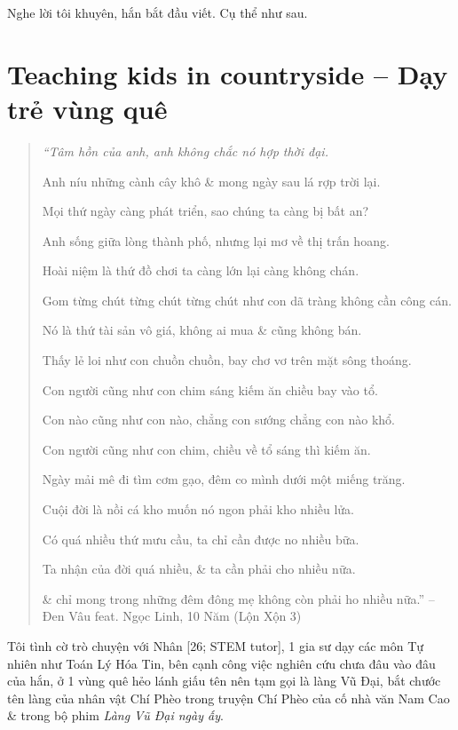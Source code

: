 \documentclass[12pt,twoside]{book}
\begin{document}
Nghe lời tôi khuyên, hắn bắt đầu viết. Cụ thể như sau.

\section{Teaching kids in countryside -- Dạy trẻ vùng quê}

\begin{quote}\small\it
	``Tâm hồn của anh, anh không chắc nó hợp thời đại.
	
	Anh níu những cành cây khô \& mong ngày sau lá rợp trời lại.
	
	Mọi thứ ngày càng phát triển, sao chúng ta càng bị bất an?
	
	Anh sống giữa lòng thành phố, nhưng lại mơ về thị trấn hoang.
	
	Hoài niệm là thứ đồ chơi ta càng lớn lại càng không chán.
	
	Gom từng chút từng chút từng chút như con dã tràng không cần công cán.
	
	Nó là thứ tài sản vô giá, không ai mua \& cũng không bán.
	
	Thấy lẻ loi như con chuồn chuồn, bay chơ vơ trên mặt sông thoáng.
	
	Con người cũng như con chim sáng kiếm ăn chiều bay vào tổ.
	
	Con nào cũng như con nào, chẳng con sướng chẳng con nào khổ.
	
	Con người cũng như con chim, chiều về tổ sáng thì kiếm ăn.
	
	Ngày mải mê đi tìm cơm gạo, đêm co mình dưới một miếng trăng.
	
	Cuội đời là nồi cá kho muốn nó ngon phải kho nhiều lửa.
	
	Có quá nhiều thứ mưu cầu, ta chỉ cần được no nhiều bữa.
	
	Ta nhận của đời quá nhiều, \& ta cần phải cho nhiều nữa.
	
	\& chỉ mong trong những đêm đông mẹ không còn phải ho nhiều nữa.'' -- {\sc Đen Vâu} feat. {\sc Ngọc Linh}, 10 Năm (Lộn Xộn 3)
\end{quote}
Tôi tình cờ trò chuyện với {\sf Nhân [26; STEM tutor]}, 1 gia sư dạy các môn Tự nhiên như Toán Lý Hóa Tin, bên cạnh công việc nghiên cứu chưa đâu vào đâu của hắn, ở 1 vùng quê hẻo lánh giấu tên nên tạm gọi là làng {\sf Vũ Đại}, bắt chước tên làng của nhân vật {\sf Chí Phèo} trong truyện {\sf Chí Phèo} của cố nhà văn {\sc Nam Cao} \& trong bộ phim {\it Làng Vũ Đại ngày ấy}.
\end{document}
